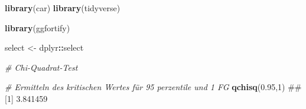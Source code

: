 \documentclass[]{book}
\newenvironment{Shaded}{\begin{snugshade}}{\end{snugshade}}
\newcommand{\KeywordTok}[1]{\textcolor[rgb]{0.13,0.29,0.53}{\textbf{#1}}}
\newcommand{\DecValTok}[1]{\textcolor[rgb]{0.00,0.00,0.81}{#1}}
\newcommand{\FloatTok}[1]{\textcolor[rgb]{0.00,0.00,0.81}{#1}}
\newcommand{\StringTok}[1]{\textcolor[rgb]{0.31,0.60,0.02}{#1}}
\newcommand{\CommentTok}[1]{\textcolor[rgb]{0.56,0.35,0.01}{\textit{#1}}}
\newcommand{\OperatorTok}[1]{\textcolor[rgb]{0.81,0.36,0.00}{\textbf{#1}}}
\newcommand{\NormalTok}[1]{#1}
\begin{document}
\begin{Shaded}
\begin{Highlighting}[]
\KeywordTok{library}\NormalTok{(car)}
\KeywordTok{library}\NormalTok{(tidyverse)}

\KeywordTok{library}\NormalTok{(ggfortify)}

\NormalTok{select <-}\StringTok{ }\NormalTok{dplyr}\OperatorTok{::}\NormalTok{select}
\end{Highlighting}
\end{Shaded}

\begin{Shaded}
\begin{Highlighting}[]

\CommentTok{# Chi-Quadrat-Test}

\CommentTok{# Ermitteln des kritischen Wertes für 95 perzentile und 1 FG}
\KeywordTok{qchisq}\NormalTok{(}\FloatTok{0.95}\NormalTok{,}\DecValTok{1}\NormalTok{)}
\NormalTok{## [1] 3.841459}
\end{Highlighting}
\end{Shaded}
\end{document}

